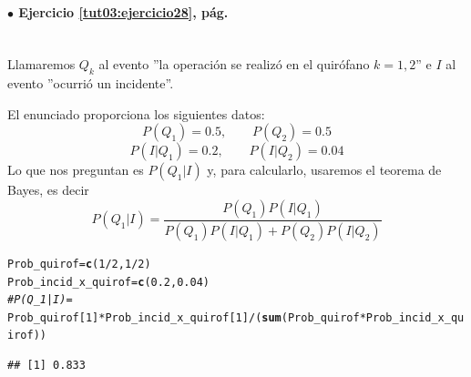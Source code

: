 \documentclass[10pt,a4paper]{article}\usepackage[]{graphicx}\usepackage[]{color}
\makeatletter
\newcommand{\hlnum}[1]{\textcolor[rgb]{0.686,0.059,0.569}{#1}}%
\newcommand{\hlcom}[1]{\textcolor[rgb]{0.678,0.584,0.686}{\textit{#1}}}%
\newcommand{\hlopt}[1]{\textcolor[rgb]{0,0,0}{#1}}%
\newcommand{\hlstd}[1]{\textcolor[rgb]{0.345,0.345,0.345}{#1}}%
\newcommand{\hlkwb}[1]{\textcolor[rgb]{0.69,0.353,0.396}{#1}}%
\newcommand{\hlkwd}[1]{\textcolor[rgb]{0.737,0.353,0.396}{\textbf{#1}}}%
\newenvironment{kframe}{%
 \def\at@end@of@kframe{}%
 \ifinner\ifhmode%
  \def\at@end@of@kframe{\end{minipage}}%
  \begin{minipage}{\columnwidth}%
 \fi\fi%
 \def\FrameCommand##1{\hskip\@totalleftmargin \hskip-\fboxsep
 \colorbox{shadecolor}{##1}\hskip-\fboxsep
     \hskip-\linewidth \hskip-\@totalleftmargin \hskip\columnwidth}%
 \MakeFramed {\advance\hsize-\width
   \@totalleftmargin\z@ \linewidth\hsize
   \@setminipage}}%
 {\par\unskip\endMakeFramed%
 \at@end@of@kframe}
\newenvironment{knitrout}{}{} %
\makeatother
\begin{document}
\paragraph{\bf $\bullet$ Ejercicio \ref{tut03:ejercicio28}, pág. \pageref{tut03:ejercicio28}}
\label{tut03:ejercicio28:sol}\quad\\
Llamaremos $Q_k$ al evento ''la operación se realizó en el  quirófano $k=1,2$'' e $I$ al evento ''ocurrió un incidente''.

El enunciado proporciona los siguientes datos: 
$$P(Q_1)=0\text{.}5,\qquad P(Q_2)=0\text{.}5$$
$$P(I|Q_1)=0\text{.}2,\qquad P(I|Q_2)=0\text{.}04$$ 
Lo que nos preguntan es $P(Q_1|I)$ y, para calcularlo,  usaremos el teorema de Bayes, es decir
$$P(Q_1|I) = \frac{P(Q_1)P(I|Q_1)}{P(Q_1)P(I|Q_1)+P(Q_2)P(I|Q_2)}$$

\begin{knitrout}
\color{fgcolor}\begin{kframe}
\begin{alltt}
\hlstd{Prob_quirof} \hlkwb{=} \hlkwd{c}\hlstd{(}\hlnum{1}\hlopt{/}\hlnum{2}\hlstd{,} \hlnum{1}\hlopt{/}\hlnum{2}\hlstd{)}
\hlstd{Prob_incid_x_quirof} \hlkwb{=} \hlkwd{c}\hlstd{(}\hlnum{0.2}\hlstd{,} \hlnum{0.04}\hlstd{)}
\hlcom{# P(Q_1|I) =}
\hlstd{Prob_quirof[}\hlnum{1}\hlstd{]}\hlopt{*}\hlstd{Prob_incid_x_quirof[}\hlnum{1}\hlstd{]}\hlopt{/}\hlstd{(}\hlkwd{sum}\hlstd{(Prob_quirof}\hlopt{*}\hlstd{Prob_incid_x_quirof))}
\end{alltt}
\begin{verbatim}
## [1] 0.833
\end{verbatim}
\end{kframe}
\end{knitrout}

\end{document}
